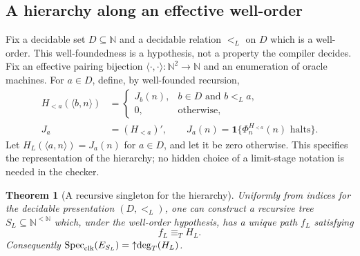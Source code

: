 \documentclass[11pt,letterpaper]{article}
\newtheorem{theorem}{Theorem}[section]
\theoremstyle{definition}
\theoremstyle{remark}
\newcommand{\N}{\mathbb N}
\newcommand{\ind}{\mathbf 1}
\newcommand{\1}{\mathbf 1}
\newcommand{\csdegT}{\operatorname{deg}_{T}}
\newcommand{\csSpec}{\operatorname{Spec}_{\rm clk}}
\newcommand{\csCone}[1]{\mathord{\uparrow}\!#1}
\begin{document}
\subsection{A hierarchy along an effective well-order}
Fix a decidable set $D\subseteq\N$ and a decidable relation $<_L$ on $D$
which is a well-order. This well-foundedness is a hypothesis, not a
property the compiler decides. Fix an effective pairing bijection
$\langle\cdot,\cdot\rangle:\N^2\to\N$ and an enumeration of oracle machines.
For $a\in D$, define, by well-founded recursion,
\begin{align}
 H_{<a}(\langle b,n\rangle)
   &=\begin{cases}J_b(n),&b\in D\text{ and }b<_L a,\\0,&\text{otherwise},\end{cases}
       \label{lbh:cs:eq:lowerjoin}\\
 J_a&=(H_{<a})',\qquad
 J_a(n)=\ind\{\Phi_n^{H_{<a}}(n)\text{ halts}\}.
       \label{lbh:cs:eq:jump}
\end{align}
Let $H_L(\langle a,n\rangle)=J_a(n)$ for $a\in D$, and let it be zero
otherwise. This specifies the representation of the hierarchy; no hidden
choice of a limit-stage notation is needed in the checker.

\begin{theorem}[A recursive singleton for the hierarchy]\label{lbh:cs:thm:jump-tree}
Uniformly from indices for the decidable presentation $(D,<_L)$, one can
construct a recursive tree $S_L\subseteq\N^{<\N}$ which, under the
well-order hypothesis, has a unique path $f_L$ satisfying
\[
 f_L\equiv_T H_L.
\]
Consequently $\csSpec(E_{S_L})=\csCone{\csdegT(H_L)}$.
\end{theorem}
\end{document}
